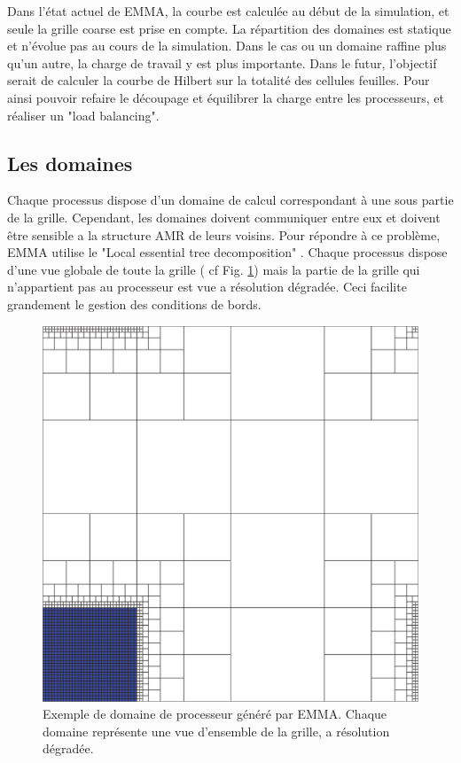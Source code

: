 %

Dans l'état actuel de EMMA, la courbe est calculée au début de la simulation, et seule la grille coarse est prise en compte.
La répartition des domaines est statique et n'évolue pas au cours de la simulation.
Dans le cas ou un domaine raffine plus qu'un autre, la charge de travail y est plus importante.
Dans le futur, l'objectif serait de calculer la courbe de Hilbert sur la totalité des cellules feuilles.
Pour ainsi pouvoir refaire le découpage et équilibrer la charge entre les processeurs, et réaliser un "load balancing".

\subsection{Les domaines}

Chaque processus dispose d'un domaine de calcul correspondant à une sous partie de la grille.
Cependant, les domaines doivent communiquer entre eux et doivent être sensible a la structure \ac{AMR} de leurs voisins.
Pour répondre à ce problème, EMMA utilise le "Local essential tree decomposition" \citep{Warren:1993:PHO:169627.169640}.
Chaque processus dispose d'une vue globale de toute la grille ( cf Fig. \ref{fig:domaine}) mais la partie de la grille qui n'appartient pas au processeur est vue a résolution dégradée.
Ceci facilite grandement le gestion des conditions de bords.

\begin{figure}[bth]
        \includegraphics[width=.95\linewidth]{img/02/secteur.png} 
        \caption[Domaine associé a un processus]{Exemple de domaine de processeur généré par EMMA. 
        Chaque domaine représente une vue d'ensemble de la grille, a résolution dégradée.
}
 		\label{fig:domaine}
\end{figure}

